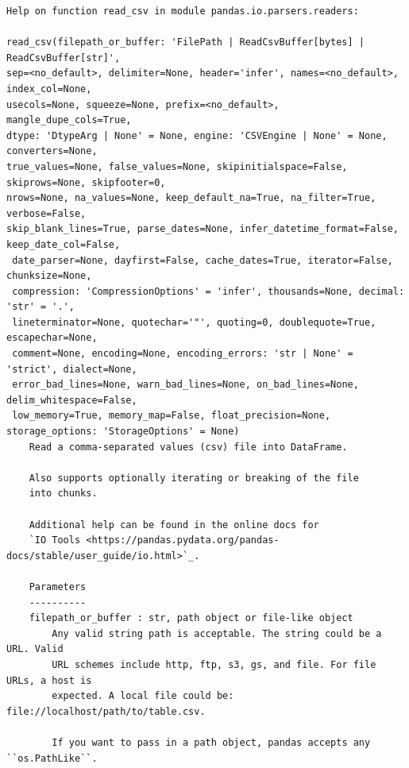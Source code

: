 \documentclass[
  letterpaper,
]{book}
\begin{document}
\begin{verbatim}
Help on function read_csv in module pandas.io.parsers.readers:

read_csv(filepath_or_buffer: 'FilePath | ReadCsvBuffer[bytes] | ReadCsvBuffer[str]',
sep=<no_default>, delimiter=None, header='infer', names=<no_default>, index_col=None,
usecols=None, squeeze=None, prefix=<no_default>, mangle_dupe_cols=True,
dtype: 'DtypeArg | None' = None, engine: 'CSVEngine | None' = None, converters=None,
true_values=None, false_values=None, skipinitialspace=False, skiprows=None, skipfooter=0,
nrows=None, na_values=None, keep_default_na=True, na_filter=True, verbose=False,
skip_blank_lines=True, parse_dates=None, infer_datetime_format=False, keep_date_col=False,
 date_parser=None, dayfirst=False, cache_dates=True, iterator=False, chunksize=None,
 compression: 'CompressionOptions' = 'infer', thousands=None, decimal: 'str' = '.',
 lineterminator=None, quotechar='"', quoting=0, doublequote=True, escapechar=None,
 comment=None, encoding=None, encoding_errors: 'str | None' = 'strict', dialect=None,
 error_bad_lines=None, warn_bad_lines=None, on_bad_lines=None, delim_whitespace=False,
 low_memory=True, memory_map=False, float_precision=None, storage_options: 'StorageOptions' = None)
    Read a comma-separated values (csv) file into DataFrame.

    Also supports optionally iterating or breaking of the file
    into chunks.

    Additional help can be found in the online docs for
    `IO Tools <https://pandas.pydata.org/pandas-docs/stable/user_guide/io.html>`_.

    Parameters
    ----------
    filepath_or_buffer : str, path object or file-like object
        Any valid string path is acceptable. The string could be a URL. Valid
        URL schemes include http, ftp, s3, gs, and file. For file URLs, a host is
        expected. A local file could be: file://localhost/path/to/table.csv.

        If you want to pass in a path object, pandas accepts any ``os.PathLike``.


\end{verbatim}
\end{document}
